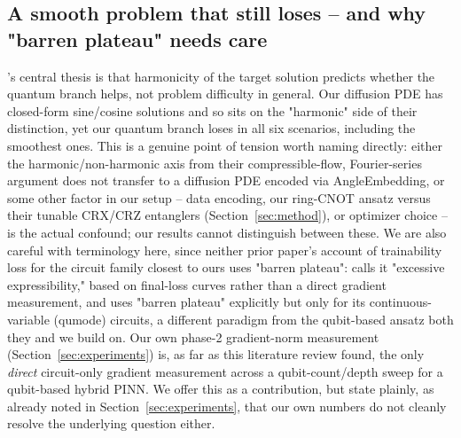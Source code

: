 \subsection{A smooth problem that still loses -- and why "barren plateau" needs care}
\citet{hqpinn2025flow}'s central thesis is that harmonicity of the target
solution predicts whether the quantum branch helps, not problem difficulty
in general. Our diffusion PDE has closed-form sine/cosine solutions and so
sits on the "harmonic" side of their distinction, yet our quantum branch
loses in all six scenarios, including the smoothest ones. This is a
genuine point of tension worth naming directly: either the
harmonic/non-harmonic axis from their compressible-flow, Fourier-series
argument does not transfer to a diffusion PDE encoded via AngleEmbedding,
or some other factor in our setup -- data encoding, our ring-CNOT ansatz
versus their tunable CRX/CRZ entanglers (Section~\ref{sec:method}), or
optimizer choice -- is the actual confound; our results cannot distinguish
between these. We are also careful with terminology here, since neither
prior paper's account of trainability loss for the circuit family closest
to ours uses "barren plateau": \citet{hqpinn2025flow} calls it "excessive
expressibility," based on final-loss curves rather than a direct gradient
measurement, and \citet{farea2025qcpinn} uses "barren plateau" explicitly
but only for its continuous-variable (qumode) circuits, a different
paradigm from the qubit-based ansatz both they and we build on. Our own
phase-2 gradient-norm measurement (Section~\ref{sec:experiments}) is, as
far as this literature review found, the only \emph{direct} circuit-only
gradient measurement across a qubit-count/depth sweep for a qubit-based
hybrid PINN. We offer this as a contribution, but state plainly, as
already noted in Section~\ref{sec:experiments}, that our own numbers do
not cleanly resolve the underlying question either.

